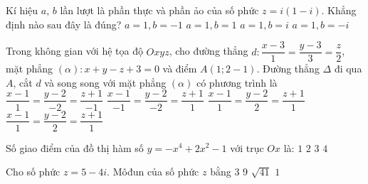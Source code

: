 \begin{ex}%
Kí hiệu $a$, $b$ lần lượt là phần thực và phần ảo của số phức $z=i(1-i)$. Khẳng định nào sau đây là đúng?
\choice
{$a=1, b=-1$}  
{\True $a=1, b=1$}  
{$a=1, b=i$}  
{$a=1, b=-i$}
\end{ex}

\begin{ex}%
Trong không gian với hệ tọa độ $Oxyz$, cho đường thẳng $d:\dfrac{x-3}{1}=\dfrac{y-3}{3}=\dfrac{z}{2}$, mặt phẳng $(\alpha): x+y-z+3=0$ và điểm $A(1;2-1)$. Đường thẳng $\Delta $ đi qua $A$, cắt $d$ và song song với mặt phẳng $(\alpha)$ có phương trình là
\choice
{\True $\dfrac{x-1}{1}=\dfrac{y-2}{-2}=\dfrac{z+1}{-1}$}  
{$\dfrac{x-1}{-1}=\dfrac{y-2}{-2}=\dfrac{z+1}{1}$}  
{$\dfrac{x-1}{1}=\dfrac{y-2}{2}=\dfrac{z+1}{1}$}  
{$\dfrac{x-1}{1}=\dfrac{y-2}{2}=\dfrac{z+1}{1}$}
\end{ex}

\begin{ex}%
Số giao điểm của đồ thị hàm số $y=-x^{4}+2x^{2}-1$ với trục $Ox$ là:
\choice
{$1$}  
{\True $2$}  
{$3$}  
{$4$}
\end{ex}

\begin{ex}%
Cho số phức $z=5-4i$. Môđun của số phức $z$ bằng
\choice
{$3$}  
{$9$}  
{\True $\sqrt{41}$}  
{$1$}
\end{ex}

